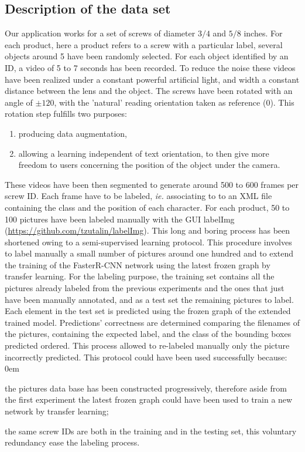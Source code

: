 \documentclass[12pt, french, a4paper]{article} %
\let\tempone\itemize
\let\temptwo\enditemize
\renewenvironment{itemize}{\tempone\addtolength{\itemsep}{-0.3\baselineskip}}{\temptwo}
\newcommand{\link}[1]{{\color{Blue}\scriptsize\href{#1}{#1}}}
\begin{document}
\subsection{Description of the data set}
Our application works for a set of screws of diameter $3/4$ and $5/8$ inches. For each product, here a product refers to a screw with a particular label, several objects around 5 have been randomly selected. For each object identified by an ID, a video of 5 to 7 seconds has been recorded. To reduce the noise these videos have been realized under a constant powerful artificial light, and width a constant distance between the lens and the object. The screws have been rotated with an angle of $\pm 120$\textdegree, with the 'natural' reading orientation taken as reference ($0$\textdegree). This rotation step fulfills two purposes:
\begin{enumerate}
\itemsep0em 
 \item producing data augmentation,
 \item allowing a learning independent of text orientation, to then give more freedom to users concerning the position of the object under the camera.
\end{enumerate}
These videos have been then segmented to generate around 500 to 600 frames per screw ID. Each frame have to be labeled, \textit{ie.} associating to to an XML file containing the class and the position of each character. For each product, 50 to 100 pictures have been labeled manually with the GUI labelImg (\link{https://github.com/tzutalin/labelImg}). This long and boring process has been shortened owing to a semi-supervised learning protocol. This procedure involves to label manually a small number of pictures around one hundred and to extend the training of the Faster\gls{R-CNN} network using the latest frozen graph by transfer learning. For the labeling purpose, the training set contains all the pictures already labeled from the previous experiments and the ones that just have been manually annotated, and as a test set the remaining pictures to label. Each element in the test set is predicted using the frozen graph of the extended trained model. Predictions' correctness are determined comparing the filenames of the pictures, containing the expected label, and the class of the bounding boxes predicted ordered. This process allowed to re-labeled manually only the picture incorrectly predicted. This protocol could have been used successfully because: 
\begin{itemize}
\itemsep0em 
 \item the pictures data base has been constructed progressively, therefore aside from the first experiment the latest frozen graph could have been used to train a new network by transfer learning;
 \item the same screw IDs are both in the training and in the testing set, this voluntary redundancy ease the labeling process.
\end{itemize} 
\end{document}

